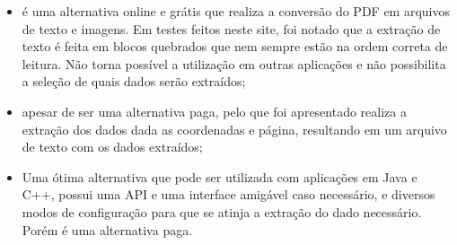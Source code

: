 \begin{enumerate}
\begin{itemize}
    \item \textbf{\cite{epdf}} é uma alternativa online e grátis que realiza a conversão do PDF em arquivos de texto e imagens. Em testes feitos neste site, foi notado que a extração de texto é feita em blocos quebrados que nem sempre estão na ordem correta de leitura. Não torna possível a utilização em outras aplicações e não possibilita a seleção de quais dados serão extraídos;
    
    \item \textbf{\cite{dparser}} apesar de ser uma alternativa paga, pelo que foi apresentado realiza a extração dos dados dada as coordenadas e página, resultando em um arquivo de texto com os dados extraídos; 
    
    \item \textbf{\cite{ipdf}} Uma ótima alternativa que pode ser utilizada com aplicações em Java e C++, possui uma API e uma interface amigável caso necessário, e diversos modos de configuração para que se atinja a extração do dado necessário. Porém é uma alternativa paga.
    
\end{itemize}

\end{enumerate}